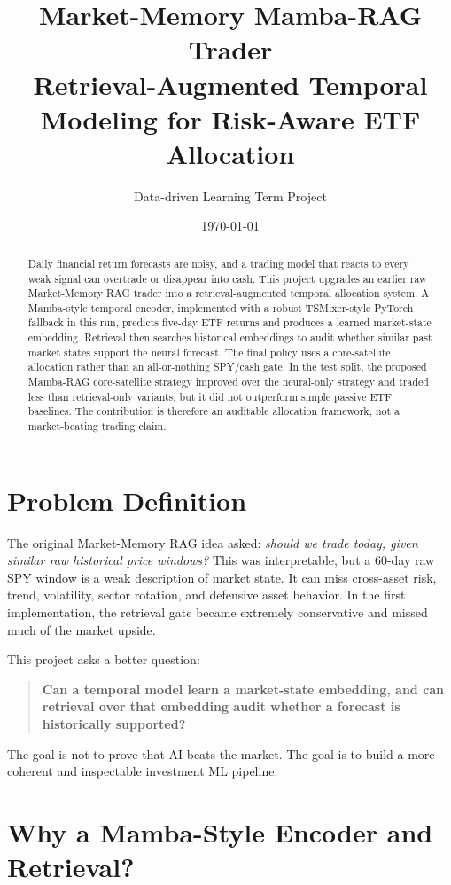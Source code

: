 \documentclass[11pt]{article}
\title{\vspace{-1.0cm}\textbf{Market-Memory Mamba-RAG Trader}\\\large Retrieval-Augmented Temporal Modeling for Risk-Aware ETF Allocation}
\author{Data-driven Learning Term Project}
\date{\today}
\begin{document}
\maketitle

\begin{abstract}
Daily financial return forecasts are noisy, and a trading model that reacts to every weak signal can overtrade or disappear into cash. This project upgrades an earlier raw Market-Memory RAG trader into a retrieval-augmented temporal allocation system. A Mamba-style temporal encoder, implemented with a robust TSMixer-style PyTorch fallback in this run, predicts five-day ETF returns and produces a learned market-state embedding. Retrieval then searches historical embeddings to audit whether similar past market states support the neural forecast. The final policy uses a core-satellite allocation rather than an all-or-nothing SPY/cash gate. In the test split, the proposed Mamba-RAG core-satellite strategy improved over the neural-only strategy and traded less than retrieval-only variants, but it did not outperform simple passive ETF baselines. The contribution is therefore an auditable allocation framework, not a market-beating trading claim.
\end{abstract}

\section{Problem Definition}
The original Market-Memory RAG idea asked: \emph{should we trade today, given similar raw historical price windows?} This was interpretable, but a 60-day raw SPY window is a weak description of market state. It can miss cross-asset risk, trend, volatility, sector rotation, and defensive asset behavior. In the first implementation, the retrieval gate became extremely conservative and missed much of the market upside.

This project asks a better question:
\begin{quote}
\textbf{Can a temporal model learn a market-state embedding, and can retrieval over that embedding audit whether a forecast is historically supported?}
\end{quote}
The goal is not to prove that AI beats the market. The goal is to build a more coherent and inspectable investment ML pipeline.

\section{Why a Mamba-Style Encoder and Retrieval?}
\end{document}
